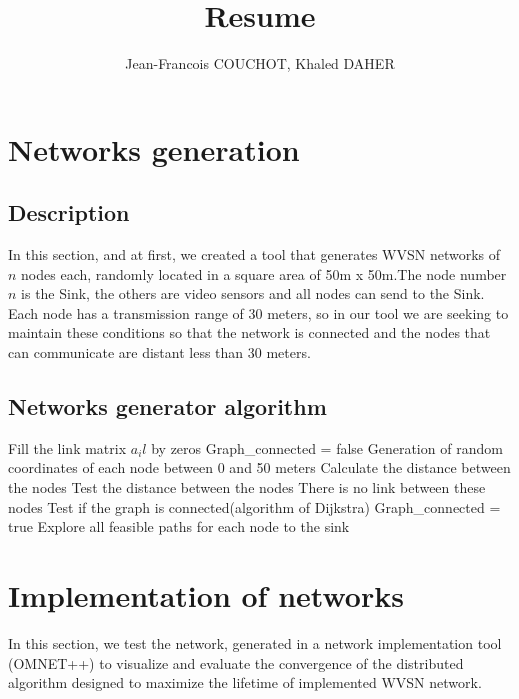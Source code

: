 \documentclass[12pt,a4]{article}
\begin{document}
\title{Resume}
\author{Jean-Francois COUCHOT, Khaled DAHER}
\maketitle

\section{Networks generation}
\subsection{Description}
\hspace{0.6cm}In this section, and at first, we created a tool that generates WVSN networks of $n$ nodes each, randomly located in a square area of 50m x 50m.The node number $n$ is the Sink, the others are video sensors and all nodes can send to the Sink. Each node has a transmission range of 30 meters, so in our tool we are  seeking to maintain these conditions so that the network is connected and the nodes that can communicate are distant less than 30 meters.
\subsection{Networks generator algorithm}
\begin{algorithm}
\begin{algorithmic}
\STATE Fill the link matrix $a_il$ by zeros
\STATE  Graph\_connected = false
\STATE Generation of random coordinates of each node between 0 and 50 meters
\STATE Calculate the distance between the nodes
\STATE Test the distance between the nodes
	\STATE There is no link between these nodes
   \ENDIF
\STATE Test if the graph is connected(algorithm of Dijkstra)
	\STATE Graph\_connected = true
\ENDIF
\ENDWHILE
\STATE Explore all feasible paths for each node to the sink
\end{algorithmic}
\end{algorithm}

\section{Implementation of networks}

\hspace{0.6cm}In this section, we test the network, generated in a network implementation tool (OMNET++) to visualize and evaluate the convergence of the distributed algorithm designed to maximize the lifetime of implemented WVSN network.
\end{document}
